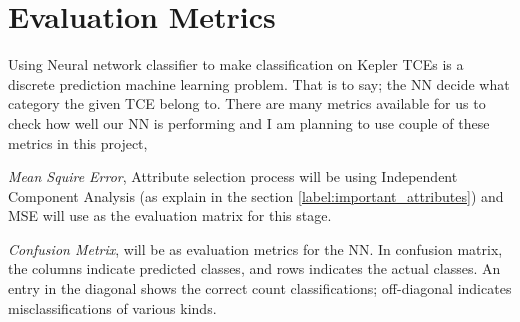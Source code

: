 \chapter{Evaluation Metrics}

Using Neural network classifier to make classification on Kepler TCEs is a discrete prediction machine learning problem. That is to say; the NN decide what category the given TCE belong to. There are many metrics available for us to check how well our NN is performing and I am planning to use couple of these metrics in this project,

\emph{Mean Squire Error}, Attribute selection process will be using  Independent Component Analysis (as explain in the section \ref{label:important_attributes}) and MSE will use as the evaluation matrix for this stage.

\emph{Confusion Metrix}, will be as evaluation metrics for the NN. In confusion matrix, the columns indicate predicted classes, and rows indicates the actual classes. An entry in the diagonal shows the correct count classifications; off-diagonal indicates misclassifications of various kinds.
